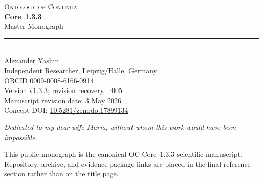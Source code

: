 \begin{titlepage}
\label{sec:oc133-title-page}
\thispagestyle{empty}
\begin{center}
\vspace*{1.0cm}
{\sffamily\Large\color{ocTitleBlue}\textsc{Ontology of Continua}}\\[0.38cm]
{\sffamily\Huge\bfseries Core~1.3.3}\\[0.28cm]
{\sffamily\Large Master Monograph}\\[0.75cm]
{\color{ocTitleGold}\rule{0.42\textwidth}{0.5pt}}\\[0.95cm]

{\Large Alexander Yashin}\\[0.2cm]
{\normalsize Independent Researcher, Leipzig/Halle, Germany}\\[0.2cm]
{\normalsize \href{https://orcid.org/0009-0008-6166-0914}{ORCID 0009-0008-6166-0914}}\\[1.0cm]

{\normalsize Version v1.3.3; revision recovery\_r005}\\[0.3cm]
{\normalsize Manuscript revision date: 3 May 2026}\\[0.3cm]
{\normalsize Concept DOI: \href{https://doi.org/10.5281/zenodo.17899134}{10.5281/zenodo.17899134}}\\[0.9cm]

\vfill

{\small\itshape Dedicated to my dear wife Maria, without whom this work would have been impossible.}\\[0.8cm]

\begin{minipage}{0.86\textwidth}
\centering\scriptsize
This public monograph is the canonical OC Core~1.3.3 scientific manuscript.
Repository, archive, and evidence-package links are placed in the final reference section rather than on the title page.
\end{minipage}
\end{center}
\end{titlepage}

